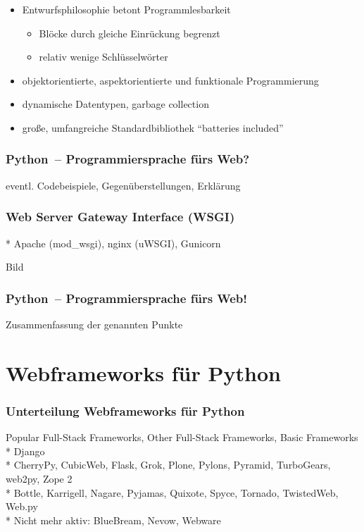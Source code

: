 \documentclass[
    t,
    smaller,
    compress,
]{beamer}
\begin{document}
\begin{frame}
  \begin{itemize}[<1->]
    \item Entwurfsphilosophie betont Programmlesbarkeit
    \begin{itemize}[<1->]
      \item Blöcke durch gleiche Einrückung begrenzt
      \item relativ wenige Schlüsselwörter
    \end{itemize}
    \item objektorientierte, aspektorientierte und funktionale Programmierung
    \item dynamische Datentypen, garbage collection
    \item große, umfangreiche Standardbibliothek “batteries included”
  \end{itemize}


\end{frame}


\begin{frame}
  \frametitle{Python~-- Programmiersprache fürs Web?}

  eventl. Codebeispiele, Gegenüberstellungen, Erklärung

\end{frame}


\begin{frame}
  \frametitle{Web Server Gateway Interface (WSGI)}
 * Apache (mod\_wsgi), nginx (uWSGI), Gunicorn

 Bild
\end{frame}


\begin{frame}
  \frametitle{Python~-- Programmiersprache fürs Web!}

  Zusammenfassung der genannten Punkte

\end{frame}


\section{Webframeworks für Python}
\begin{frame}
  \frametitle{Unterteilung Webframeworks für Python}
  Popular Full-Stack Frameworks, Other Full-Stack Frameworks, Basic Frameworks
 * Django\\
 * CherryPy, CubicWeb, Flask, Grok, Plone, Pylons, Pyramid, TurboGears, web2py, Zope 2\\
 * Bottle, Karrigell, Nagare, Pyjamas, Quixote, Spyce, Tornado, TwistedWeb, Web.py\\
 * Nicht mehr aktiv: BlueBream, Nevow, Webware\\
\end{frame}
\end{document}
